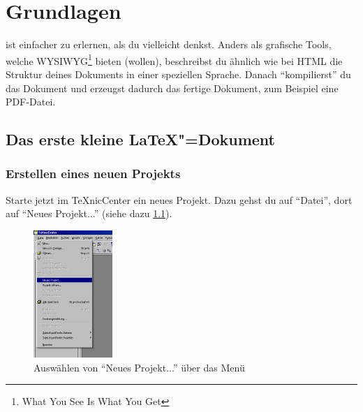 %
%

\chapter{Grundlagen}
\label{sec:grundlagen}

\DMLLaTeX{} ist einfacher zu erlernen, als du vielleicht denkst. Anders als grafische Tools, welche WYSIWYG\footnote{What You See Is What You Get} bieten (wollen), beschreibst du ähnlich wie bei HTML die Struktur deines Dokuments in einer speziellen Sprache. Danach \enquote{kompilierst} du das Dokument und erzeugst dadurch das fertige Dokument, zum Beispiel eine PDF-Datei.


\section{Das erste kleine LaTeX"=Dokument}

\subsection{Erstellen eines neuen Projekts}
\label{sec:erstellenneuesprojekt}

Starte jetzt im TeXnicCenter ein neues Projekt. Dazu gehst du auf \enquote{Datei}, dort auf \enquote{Neues Projekt...} (siehe dazu \cref{fig:beispiel1_01}).

\begin{figure}[ht]
	\begin{center}
		\includegraphics[width=3cm]{images/beispiel1_01.png}
	\end{center}
	\caption{Auswählen von \enquote{Neues Projekt...} über das Menü}
	\label{fig:beispiel1_01}
\end{figure}



